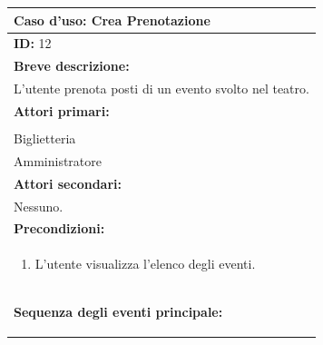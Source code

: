 \documentclass{article}
\begin{document}
                \begin{table}[H]
                    \begin{tabular}{|p{\linewidth}|}
                        \hline
                        \cellcolor{gray!100}
                        \color{white}
                        \centerline{\textbf{Caso d'uso:} Crea Prenotazione} \\
                        \hline
                        \textbf{ID:} 12 \\
                        \hline
                        \cellcolor{gray!20}
                        \textbf{Breve descrizione:} \\
                        \cellcolor{gray!20}
                        L'utente prenota posti di un evento svolto nel teatro. \\
                        \hline
                        \textbf{Attori primari:} \\
                        \begin{minipage}{\linewidth}
                            Cliente \\
                            Biglietteria \\
                            Amministratore
                        \end{minipage}
                        \vspace{0pt} \\
                        \hline
                        \textbf{Attori secondari:} \\                        
                        Nessuno. \\
                        \hline
                        \cellcolor{gray!20}
                        \textbf{Precondizioni:} \\
                        \cellcolor{gray!20}
                        \begin{minipage}{\linewidth}
                            \begin{enumerate}
                                \item L'utente visualizza l'elenco degli eventi.
                            \end{enumerate}
                        \end{minipage} \\
                        \hline
                        \textbf{Sequenza degli eventi principale:}
                        \begin{enumerate}

\end{enumerate}
\end{tabular}
\end{table}
\end{document}
